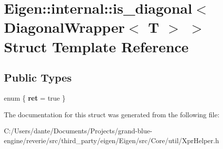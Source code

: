 \hypertarget{struct_eigen_1_1internal_1_1is__diagonal_3_01_diagonal_wrapper_3_01_t_01_4_01_4}{}\section{Eigen\+::internal\+::is\+\_\+diagonal$<$ Diagonal\+Wrapper$<$ T $>$ $>$ Struct Template Reference}
\label{struct_eigen_1_1internal_1_1is__diagonal_3_01_diagonal_wrapper_3_01_t_01_4_01_4}
\subsection*{Public Types}
\begin{DoxyCompactItemize}
\item 
\mbox{\label{struct_eigen_1_1internal_1_1is__diagonal_3_01_diagonal_wrapper_3_01_t_01_4_01_4_a5cf2efb7ef952a09d9c286da79d8edbe}} 
enum \{ {\bfseries ret} = true
 \}
\end{DoxyCompactItemize}


The documentation for this struct was generated from the following file\+:\begin{DoxyCompactItemize}
\item 
C\+:/\+Users/dante/\+Documents/\+Projects/grand-\/blue-\/engine/reverie/src/third\+\_\+party/eigen/\+Eigen/src/\+Core/util/Xpr\+Helper.\+h\end{DoxyCompactItemize}
